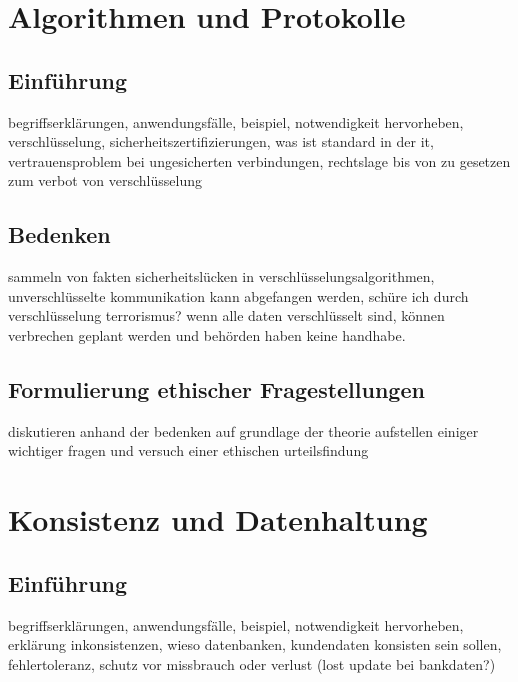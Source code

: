 \documentclass[letterpaper, 12pt]{article}
\let\tempsection\section
\renewcommand\section[1]{\vspace{-0.3cm}\tempsection{#1}\vspace{-0.3cm}}
\let\tempsubsection\subsection
\renewcommand\subsection[1]{\vspace{0cm}\tempsubsection{#1}\vspace{0cm}}
\begin{document}
\clearpage

\section{Algorithmen und Protokolle}

\subsection{Einführung}

begriffserklärungen, anwendungsfälle, beispiel, notwendigkeit hervorheben, verschlüsselung, sicherheitszertifizierungen, was ist standard in der it, vertrauensproblem bei ungesicherten verbindungen, rechtslage bis von zu gesetzen zum verbot von verschlüsselung

\subsection{Bedenken}

sammeln von fakten \newline
sicherheitslücken in verschlüsselungsalgorithmen, unverschlüsselte kommunikation kann abgefangen werden, schüre ich durch verschlüsselung terrorismus? wenn alle daten verschlüsselt sind, können verbrechen geplant werden und behörden haben keine handhabe.

\subsection{Formulierung ethischer Fragestellungen}

diskutieren anhand der bedenken auf grundlage der theorie \newline
aufstellen einiger wichtiger fragen und versuch einer ethischen urteilsfindung

\clearpage

\section{Konsistenz und Datenhaltung}

\subsection{Einführung}

begriffserklärungen, anwendungsfälle, beispiel, notwendigkeit hervorheben, erklärung inkonsistenzen, wieso datenbanken, kundendaten konsisten sein sollen, fehlertoleranz, schutz vor missbrauch oder verlust (lost update bei bankdaten?)
\end{document}

